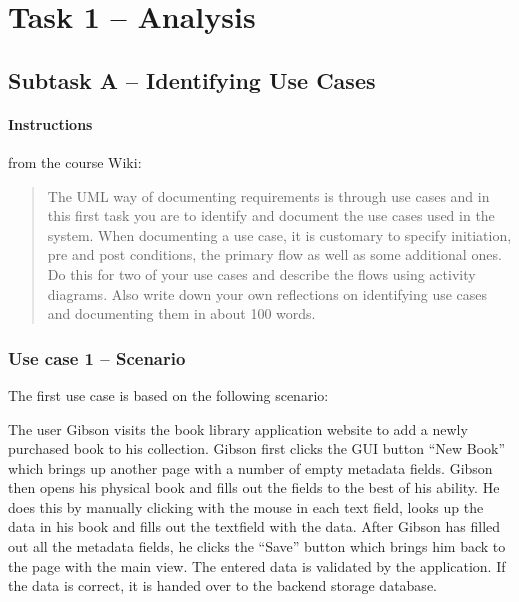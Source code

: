 %
%
%
%


\section{Task 1 -- Analysis}

\subsection{Subtask A -- Identifying Use Cases}\label{task-1a}
\paragraph{Instructions}\label{task-1a-instructions}
from the course Wiki\cite{1dv600:lab2:instructions}:

\begin{quote}
  The UML way of documenting requirements is through use cases and in this
  first task you are to identify and document the use cases used in the system.
  When documenting a use case, it is customary to specify initiation, pre and
  post conditions, the primary flow as well as some additional ones.  Do this
  for two of your use cases and describe the flows using activity diagrams.
  Also write down your own reflections on identifying use cases and documenting
  them in about 100 words.
\end{quote}


\subsubsection{Use case 1 -- Scenario}\label{task-1a-usecase1scenario}
The first use case is based on the following scenario:

The user Gibson visits the book library application website to add a newly
purchased book to his collection. Gibson first clicks the GUI button ``New
Book'' which brings up another page with a number of empty metadata fields.
Gibson then opens his physical book and fills out the fields to the best of his
ability. He does this by manually clicking with the mouse in each text field,
looks up the data in his book and fills out the textfield with the data.  After
Gibson has filled out all the metadata fields, he clicks the ``Save'' button
which brings him back to the page with the main view.
The entered data is validated by the application. If the data is correct, it is
handed over to the backend storage database.

